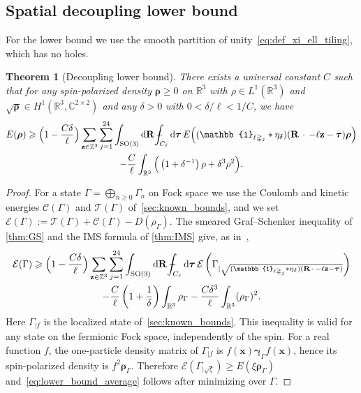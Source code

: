 \documentclass[final,reqno]{amsart}
\newtheorem{theorem}{Theorem}[section]
\theoremstyle{remark}
\renewcommand{\ge}{\geqslant}
\newcommand{\RR}{\mathbb{R}}
\newcommand{\CC}{\mathbb{C}}
\newcommand{\ZZ}{\mathbb{Z}}
\newcommand{\SO}{\mathrm{SO}}
\newcommand{\iden}{\mathbb{1}}
\newcommand{\tetra}{\mathbb{\Delta}}
\newcommand{\dd}{\mathrm{d}}
\newcommand{\TC}{\mathcal{T}}
\newcommand{\EC}{\mathcal{E}}
\newcommand{\Cc}{\mathcal{C}}
\def\Xint#1{\mathchoice
{\XXint\displaystyle\textstyle{#1}}
{\XXint\textstyle\scriptstyle{#1}}
{\XXint\scriptstyle\scriptscriptstyle{#1}}
{\XXint\scriptscriptstyle\scriptscriptstyle{#1}}
\!\int}
\def\XXint#1#2#3{{\setbox0=\hbox{$#1{#2#3}{\int}$ }
\vcenter{\hbox{$#2#3$ }}\kern-.6\wd0}}
\def\dashint{\Xint-}
\begin{document}
\subsection{Spatial decoupling lower bound}\label{sec:lower_bound}
For the lower bound we use the smooth partition of unity~\cref{eq:def_xi_ell_tiling}, which has no holes.

\begin{theorem}[Decoupling lower bound]\label{prop:lower_bound}
There exists a universal constant $C$ such that for any spin-polarized density $\bm{\rho}\ge0$ on $\RR^3$ with $\rho\in L^1(\RR^3)$ and $\sqrt{\bm{\rho}}\in H^1(\RR^3,\CC^{2\times2})$ and any $\delta>0$ with $0<\delta/\ell<1/C$, we have
\begin{multline}\label{eq:lower_bound_average}
E(\bm{\rho})\ge \Big(1-\frac{C\delta}{\ell}\Big)\sum_{\mathbf{z}\in\ZZ^3}\sum_{j=1}^{24}\int_{\SO(3)}\dd\mathbf{R}\,\dashint_{C_\ell}\dd\bm{\tau}\,E\Big((\iden_{\ell\tetra_j}\ast\eta_\delta)(\mathbf{R}\,\cdot\,-\ell \mathbf{z}-\bm{\tau})\bm{\rho}\Big)\\
-\frac{C}{\ell}\int_{\RR^3}\Big(\left(1+\delta^{-1}\right)\rho+\delta^3\rho^2\Big).
\end{multline}
\end{theorem}

\begin{proof}
For a state $\Gamma=\bigoplus_{n\ge0}\Gamma_n$ on Fock space we use the Coulomb and kinetic energies $\Cc(\Gamma)$ and $\TC(\Gamma)$ of~\cref{sec:known_bounds}, and we set $\EC(\Gamma):=\TC(\Gamma)+\Cc(\Gamma)-D(\rho_\Gamma)$. The smeared Graf--Schenker inequality of \cref{thm:GS} and the IMS formula of \cref{thm:IMS} give, as in~\cite[Eq. (54)]{lewin2020local},
\begin{multline*}
\EC(\Gamma)\ge\Big(1-\frac{C\delta}{\ell}\Big)\sum_{\mathbf{z}\in\ZZ^3}\sum_{j=1}^{24}\int_{\SO(3)}\dd\mathbf{R}\,\dashint_{C_\ell}\dd\bm{\tau}\,\EC\left(\Gamma_{|\sqrt{(\iden_{\ell\tetra_j}\ast\eta_\delta)(\mathbf{R}\,\cdot\,-\ell \mathbf{z}-\bm{\tau})}}\right)\\
-\frac{C}{\ell}\left(1+\frac{1}{\delta}\right)\int_{\RR^3}\rho_\Gamma-\frac{C\delta^3}{\ell}\int_{\RR^3}(\rho_\Gamma)^2.
\end{multline*}
Here $\Gamma_{|f}$ is the localized state of~\cref{sec:known_bounds}. This inequality is valid for any state on the fermionic Fock space, independently of the spin. For a real function $f$, the one-particle density matrix of $\Gamma_{|f}$ is $f(\mathbf{x})\bm{\gamma}_\Gamma f(\mathbf{x})$, hence its spin-polarized density is $f^2\bm{\rho}_\Gamma$. Therefore $\EC(\Gamma_{|\sqrt\xi})\ge E(\xi \bm{\rho}_\Gamma)$ and~\cref{eq:lower_bound_average} follows after minimizing over $\Gamma$.
\end{proof}
\end{document}
